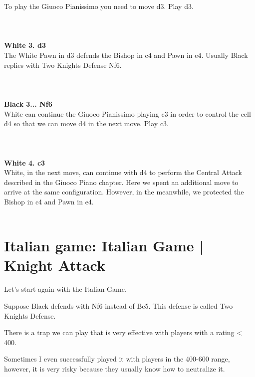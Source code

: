 \documentclass{article}
\begin{document}
To play the Giuoco Pianissimo you need to move d3. Play d3.\\
\\

\\
\\
\textbf{White 3. d3}\\
The White Pawn in d3 defends the Bishop in c4 and Pawn in e4.
Usually Black replies with Two Knights Defense Nf6.\\
\\

\\
\\
\textbf{Black 3... Nf6}\\
White can continue the Giuoco Pianissimo playing c3 in order to control the cell d4 so that we can move d4 in the next move. Play c3.\\
\\

\\
\\
\textbf{White 4. c3}\\
White, in the next move, can continue with d4 to perform the Central Attack described in the Giuoco Piano chapter. Here we spent an additional move to arrive at the same configuration. However, in the meanwhile, we protected the Bishop in c4 and Pawn in e4.\\
\\
\section{Italian game: Italian Game | Knight Attack}

Let's start again with the Italian Game.

Suppose Black defends with Nf6 instead of Bc5. This defense is called Two Knights Defense.

There is a trap we can play that is very effective with players with a rating < 400.

Sometimes I even successfully played it with players in the 400-600 range, however, it is very risky because they usually know how to neutralize it.
\end{document}
